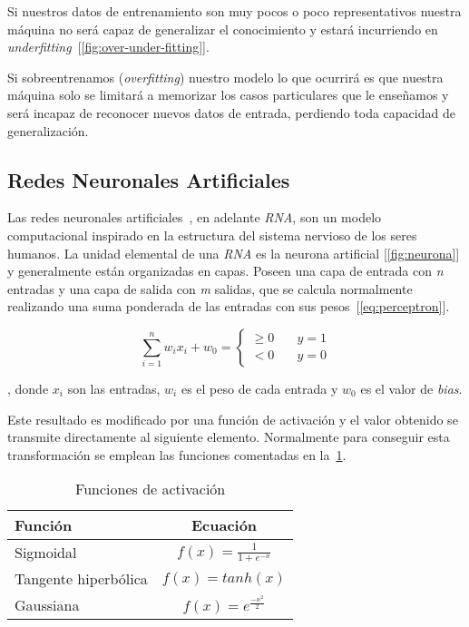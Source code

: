 Si nuestros datos de entrenamiento son muy pocos o poco representativos nuestra máquina no será capaz de generalizar el conocimiento y estará incurriendo en \textit{underfitting}~[\cref{fig:over-under-fitting}].

Si sobreentrenamos (\textit{overfitting}) nuestro modelo lo que ocurrirá es que nuestra máquina solo se limitará a memorizar los casos particulares que le enseñamos y será incapaz de reconocer nuevos datos de entrada, perdiendo toda capacidad de generalización.



\subsection{Redes Neuronales Artificiales}
Las redes neuronales artificiales~\cite{salas2004redes}, en adelante \textit{RNA}, son un modelo computacional inspirado en la estructura del sistema nervioso de los seres humanos. La unidad elemental de una \textit{RNA} es la neurona artificial [\cref{fig:neurona}] y generalmente están organizadas en capas. Poseen una capa de entrada con \textit{n} entradas y una capa de salida con \textit{m} salidas, que se calcula normalmente realizando una suma ponderada de las entradas con sus pesos~[\cref{eq:perceptron}].


\begin{equation} \label{eq:perceptron}
    \displaystyle\sum_{i=1}^{n} w_i x_i + w_0=
    \begin{cases}
        \geq 0 & \quad y = 1 \\
        <    0 & \quad y = 0
    \end{cases}
\end{equation}

, donde $x_i$ son las entradas, $w_i$ es el peso de cada entrada y $w_0$ es el valor de \textit{bias}.



Este resultado es modificado por una función de activación y el valor obtenido se transmite directamente al siguiente elemento. Normalmente para conseguir esta transformación se emplean las funciones comentadas en la~\cref{tab:functions_mlp}.

\begin{table}[htbp!]
    \centering
    \begin{tabular}{l c}
        \toprule
        \textbf{Función} & \textbf{Ecuación}\\ \midrule
        Sigmoidal       &  $f(x) = \frac{1}{1 + e^{-x}}$ \\ \midrule
        Tangente hiperbólica       & $f(x) = tanh(x)$ \\ \midrule
        Gaussiana       & $ f(x) = e^{\frac{-x^2}{2}}$  \\ 
        \bottomrule
    \end{tabular}
    \caption{Funciones de activación}
    \label{tab:functions_mlp}
\end{table}



